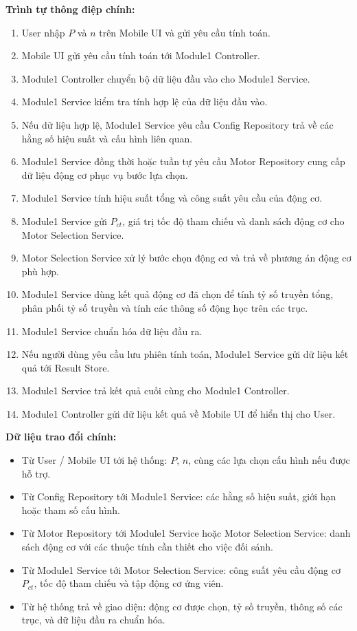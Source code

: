 \documentclass[a4paper]{article}
\begin{document}
\textbf{Trình tự thông điệp chính:}
\begin{enumerate}
\item User nhập \(P\) và \(n\) trên Mobile UI và gửi yêu cầu tính toán.
\item Mobile UI gửi yêu cầu tính toán tới Module1 Controller.
\item Module1 Controller chuyển bộ dữ liệu đầu vào cho Module1 Service.
\item Module1 Service kiểm tra tính hợp lệ của dữ liệu đầu vào.
\item Nếu dữ liệu hợp lệ, Module1 Service yêu cầu Config Repository trả về các hằng số hiệu suất và cấu hình liên quan.
\item Module1 Service đồng thời hoặc tuần tự yêu cầu Motor Repository cung cấp dữ liệu động cơ phục vụ bước lựa chọn.
\item Module1 Service tính hiệu suất tổng và công suất yêu cầu của động cơ.
\item Module1 Service gửi \(P_{ct}\), giá trị tốc độ tham chiếu và danh sách động cơ cho Motor Selection Service.
\item Motor Selection Service xử lý bước chọn động cơ và trả về phương án động cơ phù hợp.
\item Module1 Service dùng kết quả động cơ đã chọn để tính tỷ số truyền tổng, phân phối tỷ số truyền và tính các thông số động học trên các trục.
\item Module1 Service chuẩn hóa dữ liệu đầu ra.
\item Nếu người dùng yêu cầu lưu phiên tính toán, Module1 Service gửi dữ liệu kết quả tới Result Store.
\item Module1 Service trả kết quả cuối cùng cho Module1 Controller.
\item Module1 Controller gửi dữ liệu kết quả về Mobile UI để hiển thị cho User.
\end{enumerate}

\textbf{Dữ liệu trao đổi chính:}
\begin{itemize}
\item Từ User / Mobile UI tới hệ thống: \(P\), \(n\), cùng các lựa chọn cấu hình nếu được hỗ trợ.
\item Từ Config Repository tới Module1 Service: các hằng số hiệu suất, giới hạn hoặc tham số cấu hình.
\item Từ Motor Repository tới Module1 Service hoặc Motor Selection Service: danh sách động cơ với các thuộc tính cần thiết cho việc đối sánh.
\item Từ Module1 Service tới Motor Selection Service: công suất yêu cầu động cơ \(P_{ct}\), tốc độ tham chiếu và tập động cơ ứng viên.
\item Từ hệ thống trả về giao diện: động cơ được chọn, tỷ số truyền, thông số các trục, và dữ liệu đầu ra chuẩn hóa.
\end{itemize}
\end{document}
